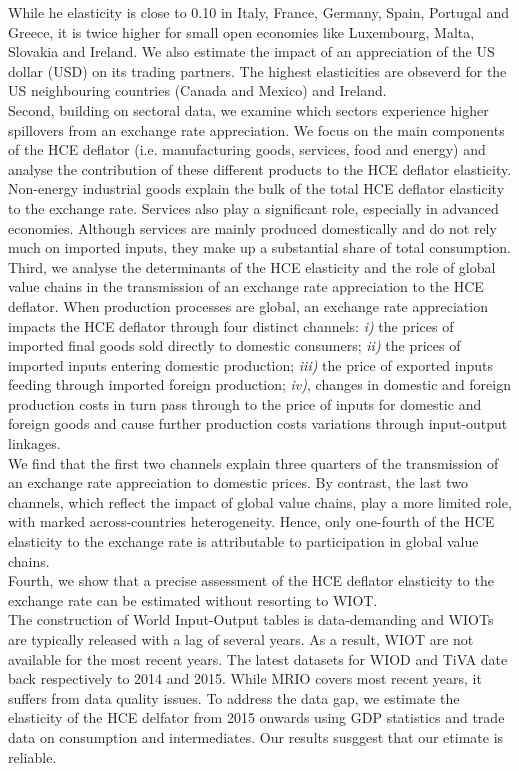 \documentclass[11pt,a4paper]{article}
\begin{document}
While he elasticity is close to 0.10 in Italy, France, Germany, Spain, Portugal and Greece, it is twice higher for small open economies like Luxembourg, Malta, Slovakia and Ireland.
We also estimate the impact of an appreciation of the US dollar (USD) on its trading partners.
The highest elasticities are obseverd for the US neighbouring countries (Canada and Mexico) and Ireland.\\
Second, building on sectoral data, we examine which sectors experience higher spillovers from an exchange rate appreciation. 
We focus on the main components of the HCE deflator (i.e. manufacturing goods, services, food and energy) and analyse the contribution of these different products to the HCE deflator elasticity.
Non-energy industrial goods explain the bulk of the total HCE deflator elasticity to the exchange rate. 
Services also play a significant role, especially in advanced economies. 
Although services are mainly produced domestically and do not rely much on imported inputs, they make up a substantial share of total consumption. \\
Third, we analyse the determinants of the HCE elasticity and the role of global value chains in the transmission of an exchange rate appreciation to the HCE deflator. 
When production processes are global, an exchange rate appreciation impacts the HCE deflator through four distinct channels: \textit{i)} the prices of imported ﬁnal goods sold directly to domestic consumers;
\textit{ii)} the prices of imported inputs entering domestic production; 
\textit{iii)} the price of exported inputs feeding through imported foreign production;
\textit{iv)}, changes in domestic and foreign production costs in turn pass through to the price of inputs for domestic and foreign goods and cause further production costs variations through input-output linkages.\\
We find that the first two channels explain three quarters of the transmission of an exchange rate appreciation to domestic prices.
By contrast, the last two channels, which reflect the impact of global value chains, play a more limited role, with marked across-countries heterogeneity.
Hence, only one-fourth of the HCE elasticity to the exchange rate is attributable to participation in global value chains.\\
Fourth, we show that a precise assessment of the HCE deflator elasticity to the exchange rate can be estimated without resorting to WIOT. \\
The construction of World Input-Output tables is data-demanding and WIOTs are typically released with a lag of several years.
As a result, WIOT are not available for the most recent years. The latest datasets for WIOD and TiVA date back respectively to 2014 and 2015. 
While MRIO covers most recent years, it suffers from data quality issues. 
To address the data gap, we estimate the elasticity of the HCE delfator from 2015 onwards using GDP statistics and trade data on consumption and intermediates. 
Our results susggest that our etimate is reliable.  \\

\newpage

\end{document}
